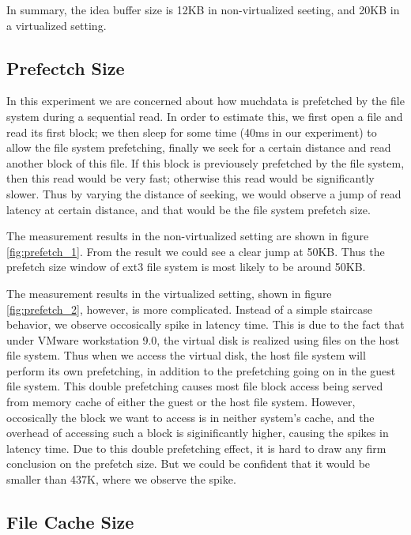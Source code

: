 In summary, the idea buffer size is 12KB in non-virtualized seeting, and 20KB in a virtualized setting.

\subsection{Prefectch Size}
In this experiment we are concerned about how muchdata is prefetched by the file system during a sequential read. In order to estimate this, we first open a file and read its first block; we then sleep for some time (40ms in our experiment) to allow the file system prefetching, finally we seek for a certain distance and read another block of this file. If this block is previousely prefetched by the file system, then this read would be very fast; otherwise this read would be significantly slower. Thus by varying the distance of seeking, we would observe a jump of read latency at certain distance, and that would be the file system prefetch size. 

The measurement results in the non-virtualized setting are shown in figure \ref{fig:prefetch_1}. From the result we could see a clear jump at 50KB. Thus the prefetch size window of ext3 file system is most likely to be around 50KB.

The measurement results in the virtualized setting, shown in figure \ref{fig:prefetch_2}, however, is more complicated. Instead of a simple staircase behavior, we observe occosically spike in latency time. This is due to the fact that under VMware workstation 9.0, the virtual disk is realized using files on the host file system. Thus when we access the virtual disk, the host file system will perform its own prefetching, in addition to the prefetching going on in the guest file system. This double prefetching causes most file block access being served from memory cache of either the guest or the host file system. However, occosically the block we want to access is in neither system's cache, and the overhead of accessing such a block is siginificantly higher, causing the spikes in latency time. Due to this double prefetching effect, it is hard to draw any firm conclusion on the prefetch size. But we could be confident that it would be smaller than 437K, where we observe the spike. 


\subsection{File Cache Size}
